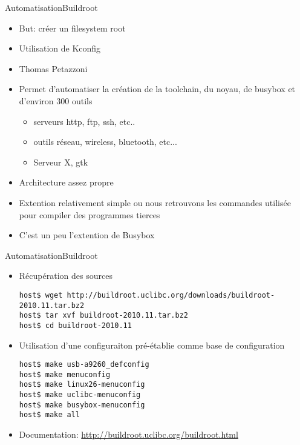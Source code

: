 \begin{frame}[fragile=singleslide]{Automatisation}{Buildroot}
  \begin{itemize}
  \item But: créer un filesystem root
  \item Utilisation de Kconfig
  \item Thomas Petazzoni
  \item Permet d'automatiser la création  de la toolchain, du noyau,
    de busybox et d'environ 300 outils
    \begin{itemize}
    \item serveurs http, ftp, ssh, etc..
    \item outils réseau, wireless, bluetooth, etc...
    \item Serveur X, gtk
    \end{itemize}
  \item Architecture assez propre
  \item Extention relativement simple ou nous retrouvons les commandes
    utilisée pour compiler des programmes tierces
  \item C'est un peu l'extention de Busybox
  \end{itemize}
\end{frame}

\begin{frame}[fragile=singleslide]{Automatisation}{Buildroot}
  \begin{itemize}
  \item Récupération des sources
    \begin{lstlisting}
host$ wget http://buildroot.uclibc.org/downloads/buildroot-2010.11.tar.bz2
host$ tar xvf buildroot-2010.11.tar.bz2
host$ cd buildroot-2010.11
    \end{lstlisting} 
  \item  Utilisation  d'une configuraiton  pré-établie  comme base  de
    configuration
    \begin{lstlisting}
host$ make usb-a9260_defconfig
host$ make menuconfig
host$ make linux26-menuconfig
host$ make uclibc-menuconfig
host$ make busybox-menuconfig
host$ make all
    \end{lstlisting}
  \item Documentation: \url{http://buildroot.uclibc.org/buildroot.html}
  \end{itemize}
\end{frame}

